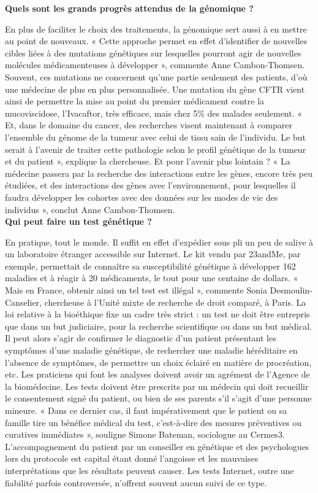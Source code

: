 \documentclass[8pt]{article}
\begin{document}
\textbf{Quels sont les grands progrès attendus de la génomique ?}

En plus de faciliter le choix des traitements, la génomique sert aussi à en mettre au point de nouveaux. « Cette approche permet en effet d’identifier de nouvelles cibles liées à des mutations génétiques sur lesquelles pourront agir de nouvelles molécules médicamenteuses à développer », commente Anne Cambon-Thomsen. Souvent, ces mutations ne concernent qu’une partie seulement des patients, d’où une médecine de plus en plus personnalisée. Une mutation du gène CFTR vient ainsi de permettre la mise au point du premier médicament contre la mucoviscidose, l’Ivacaftor, très efficace, mais chez 5\% des malades seulement. « Et, dans le domaine du cancer, des recherches visent maintenant à comparer l’ensemble du génome de la tumeur avec celui de tissu sain de l’individu. Le but serait à l’avenir de traiter cette pathologie selon le profil génétique de la tumeur et du patient », explique la chercheuse. Et pour l’avenir plus lointain ? « La médecine passera par la recherche des interactions entre les gènes, encore très peu étudiées, et des interactions des gènes avec l’environnement, pour lesquelles il faudra développer les cohortes avec des données sur les modes de vie des individus », conclut Anne Cambon-Thomsen.  \\

\textbf{Qui peut faire un test génétique ?}

En pratique, tout le monde. Il suffit en effet d’expédier sous pli un peu de salive à un laboratoire étranger accessible sur Internet. Le kit vendu par 23andMe, par exemple, permettait de connaître sa susceptibilité génétique à développer 162 maladies et à réagir à 20 médicaments, le tout pour une centaine de dollars. « Mais en France, obtenir ainsi un tel test est illégal », commente Sonia Desmoulin-Canselier, chercheuse à l’Unité mixte de recherche de droit comparé, à Paris. La loi relative à la bioéthique fixe un cadre très strict : un test ne doit être entrepris que dans un but judiciaire, pour la recherche scientifique ou dans un but médical. Il peut alors s’agir de confirmer le diagnostic d’un patient présentant les symptômes d’une maladie génétique, de rechercher une maladie héréditaire en l’absence de symptômes, de permettre un choix éclairé en matière de procréation, etc. Les praticiens qui font les analyses doivent avoir un agrément de l’Agence de la biomédecine. Les tests doivent être prescrits par un médecin qui doit recueillir le consentement signé du patient, ou bien de ses parents s’il s’agit d’une personne mineure. « Dans ce dernier cas, il faut impérativement que le patient ou sa famille tire un bénéfice médical du test, c’est-à-dire des mesures préventives ou curatives immédiates », souligne Simone Bateman, sociologue au Cermes3. L’accompagnement du patient par un conseiller en génétique et des psychologues lors du protocole est capital étant donné l’angoisse et les mauvaises interprétations que les résultats peuvent causer. Les tests Internet, outre une fiabilité parfois controversée, n’offrent souvent aucun suivi de ce type.  \\
\end{document}
